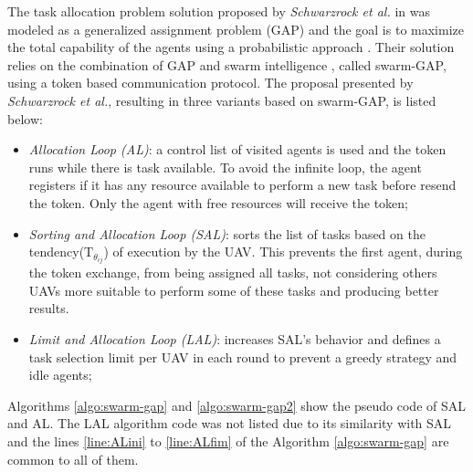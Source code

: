 The task allocation problem solution proposed by \textit{Schwarzrock et al.} in \cite{MAS07} was modeled as a generalized assignment problem (GAP)\cite{ferreira2007swarm} and the goal is to maximize the total capability of the agents using a probabilistic approach \cite{theraulaz1998response}. Their solution relies on the combination of GAP and swarm intelligence \cite{MOEA07}, called swarm-GAP, using a token based communication protocol. The proposal presented by \textit{Schwarzrock et al.}\cite{MAS07}, resulting in three variants based on swarm-GAP,  is listed below:

\begin{itemize}
   \item \textit{Allocation Loop (AL)}: a control list of visited agents is used and the token runs while there is task available. To avoid the infinite loop, the agent registers if it has any resource available to perform a new task before resend the token. Only the agent with free resources will receive the token;
   \item \textit{Sorting and Allocation Loop (SAL)}: sorts the list of tasks based on the tendency($\textrm{T}_{\theta_{ij}}$) of execution by the UAV. This prevents the first agent, during the token exchange, from being assigned all tasks, not considering others UAVs more suitable to perform some of these tasks and producing better results. 
   \item \textit{Limit and Allocation Loop (LAL)}: increases SAL's behavior and defines a task selection limit per UAV in each round to prevent a greedy strategy and idle agents;
\end{itemize}

Algorithms \ref{algo:swarm-gap} and \ref{algo:swarm-gap2} show the pseudo code of SAL and AL. The LAL algorithm code was not listed due to its similarity with SAL and the lines \ref{line:ALini} to \ref{line:ALfim} of the Algorithm \ref{algo:swarm-gap} are common to all of them.

